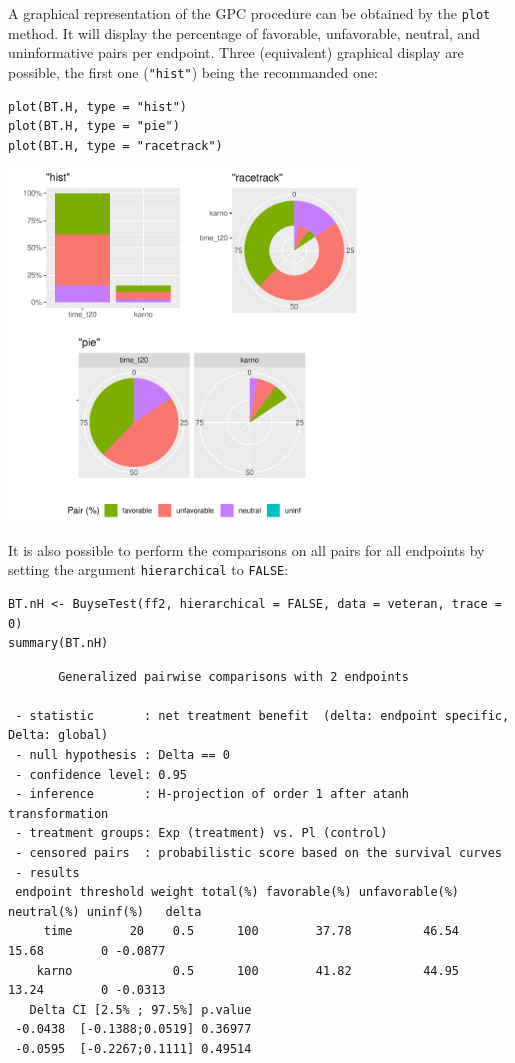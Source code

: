 \documentclass[12pt]{article}
\begin{document}
A graphical representation of the GPC procedure can be obtained by the
\texttt{plot} method. It will display the percentage of favorable,
unfavorable, neutral, and uninformative pairs per endpoint. Three
(equivalent) graphical display are possible, the first one (\texttt{"hist"})
being the recommanded one:
\lstset{language=r,label= ,caption= ,captionpos=b,numbers=none}
\begin{lstlisting}
plot(BT.H, type = "hist")
plot(BT.H, type = "pie")
plot(BT.H, type = "racetrack")
\end{lstlisting}

\begin{center}
\includegraphics[trim={0 0 0 0},width=0.7\textwidth]{./figures/plot-BuyseTest.pdf}
\end{center}


\bigskip

It is also possible to perform the comparisons on all pairs for all
endpoints by setting the argument \texttt{hierarchical} to \texttt{FALSE}:
\lstset{language=r,label= ,caption= ,captionpos=b,numbers=none}
\begin{lstlisting}
BT.nH <- BuyseTest(ff2, hierarchical = FALSE, data = veteran, trace = 0)
summary(BT.nH)
\end{lstlisting}

\begin{verbatim}
       Generalized pairwise comparisons with 2 endpoints

 - statistic       : net treatment benefit  (delta: endpoint specific, Delta: global) 
 - null hypothesis : Delta == 0 
 - confidence level: 0.95 
 - inference       : H-projection of order 1 after atanh transformation 
 - treatment groups: Exp (treatment) vs. Pl (control) 
 - censored pairs  : probabilistic score based on the survival curves
 - results
 endpoint threshold weight total(%) favorable(%) unfavorable(%) neutral(%) uninf(%)   delta
     time        20    0.5      100        37.78          46.54      15.68        0 -0.0877
    karno              0.5      100        41.82          44.95      13.24        0 -0.0313
   Delta CI [2.5% ; 97.5%] p.value 
 -0.0438  [-0.1388;0.0519] 0.36977 
 -0.0595  [-0.2267;0.1111] 0.49514
\end{verbatim}
\end{document}
